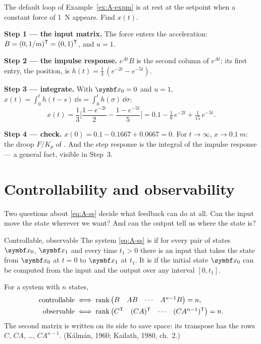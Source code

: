 \begin{example}
\label{ex:A-step}
The default loop of Example~\ref{ex:A-expm} is at rest at the setpoint when a constant force of \SI{1}{N} appears. Find $x(t)$.

\textbf{Step 1 — the input matrix.} The force enters the acceleration: $B = (0, 1/m)^{\mathsf{T}} = (0, 1)^{\mathsf{T}}$, and $u = 1$.

\textbf{Step 2 — the impulse response.} $e^{At}B$ is the second column of $e^{At}$; its first entry, the position, is $h(t) = \tfrac13\,(e^{-2t} - e^{-5t})$.

\textbf{Step 3 — integrate.} With $\vx_0 = 0$ and $u = 1$, $x(t) = \int_0^t h(t - s)\,\dd s = \int_0^t h(\sigma)\,\dd\sigma$:
\begin{equation*}
  x(t) = \frac13\Big[\frac{1 - e^{-2t}}{2} - \frac{1 - e^{-5t}}{5}\Big] = 0.1 - \tfrac16\,e^{-2t} + \tfrac1{15}\,e^{-5t} .
\end{equation*}

\textbf{Step 4 — check.} $x(0) = 0.1 - 0.1667 + 0.0667 = 0$. For $t \to \infty$, $x \to \SI{0.1}{m}$: the droop $F/K_p$ of . And the step response is the integral of the impulse response — a general fact, visible in Step~3.
\end{example}

\section{Controllability and observability}

Two questions about \cref{eq:A-ss} decide what feedback can do at all. Can the input move the state wherever we want? And can the output tell us where the state is?

\begin{definition}{Controllable, observable}
The system \eqref{eq:A-ss} is  if for every pair of states $\vx_0$, $\vx_1$ and every time $t_1 > 0$ there is an input that takes the state from $\vx_0$ at $t = 0$ to $\vx_1$ at $t_1$. It is  if the initial state $\vx_0$ can be computed from the input and the output over any interval $[0, t_1]$.
\end{definition}

\begin{theorem}
\label{thm:A-rank}
For a system with $n$ states,
\begin{align*}
  \text{controllable} &\iff \operatorname{rank}\begin{pmatrix} B & AB & \cdots & A^{n-1}B\end{pmatrix} = n ,\\
  \text{observable} &\iff \operatorname{rank}\begin{pmatrix} C^{\mathsf{T}} & (CA)^{\mathsf{T}} & \cdots & (CA^{n-1})^{\mathsf{T}}\end{pmatrix} = n .
\end{align*}
The second matrix is written on its side to save space: its transpose has the rows $C$, $CA$, \dots, $CA^{n-1}$.
(Kálmán, 1960; Kailath, 1980, ch.~2.)
\end{theorem}

